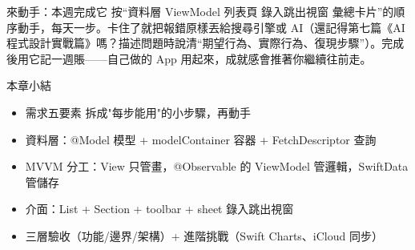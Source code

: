 \begin{tcbpractice}{來動手：本週完成它}
按“資料層 ViewModel 列表頁 錄入跳出視窗 彙總卡片”的順序動手，每天一步。卡住了就把報錯原樣丟給搜尋引擎或 AI（還記得第七篇《AI程式設計實戰篇》嗎？描述問題時說清“期望行為、實際行為、復現步驟”）。完成後用它記一週賬——自己做的 App 用起來，成就感會推著你繼續往前走。

\end{tcbpractice}

\begin{tcbsummary}{本章小結}
\begin{itemize}
  \item 需求五要素 拆成"每步能用"的小步驟，再動手
  \item 資料層：@Model 模型 + modelContainer 容器 + FetchDescriptor 查詢
  \item MVVM 分工：View 只管畫，@Observable 的 ViewModel 管邏輯，SwiftData 管儲存
  \item 介面：List + Section + toolbar + sheet 錄入跳出視窗
  \item 三層驗收（功能/邊界/架構）+ 進階挑戰（Swift Charts、iCloud 同步）
\end{itemize}

\end{tcbsummary}
